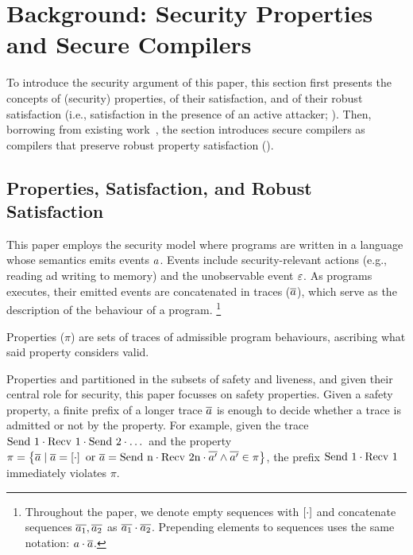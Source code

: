 \documentclass[utf8,acmsmall,review,screen,dvipsnames]{acmart}
\begin{document}
\section{Background: Security Properties and Secure Compilers}\label{sec:background}
To introduce the security argument of this paper, this section first presents the concepts of (security) properties, of their satisfaction, and of their robust satisfaction (i.e., satisfaction in the presence of an active attacker; ).
Then, borrowing from existing work~\cite{abate2019jour,abate2021extacc,patrignani2021rsc}, the section introduces secure compilers as compilers that preserve robust property satisfaction ().

\subsection{Properties, Satisfaction, and Robust Satisfaction}\label{subsec:bg:tprop}

This paper employs the security model where programs are written in a language whose semantics emits events $\event$.
Events include security-relevant actions (e.g., reading ad writing to memory) and the unobservable event $\emptyevent$.
As programs executes, their emitted events are concatenated in traces ($\trace$), which serve as the description of the behaviour of a program.%
\footnote{
Throughout the paper, we denote empty sequences with $\hole{\cdot}$ and concatenate sequences $\trace[_{1}],\trace[_{2}]$ as $\trace[_{1}]\cdot\trace[_{2}]$.
Prepending elements to sequences uses the same notation: $\event\cdot\trace$.
}

Properties ($\pi$) are sets of traces of admissible program behaviours, ascribing what said property considers valid.



Properties and partitioned in the subsets of safety and liveness, and given their central role for security, this paper focusses on safety properties.
Given a safety property, a finite prefix of a longer trace $\trace$ is enough to decide whether a trace is admitted or not by the property. %
For example, given the trace $\ev{Send\ 1}\cdot\ev{Recv\ 1}\cdot\ev{Send\ 2}\cdot\dots$ and the property $\pi=\left\{\trace \mid \trace=\hole{\cdot} \text{ or } \trace=\ev{Send\ n}\cdot\ev{Recv\ 2n}\cdot\trace[']\wedge \trace[']\in\pi\right\}$, the prefix $\ev{Send\ 1}\cdot\ev{Recv\ 1}$ immediately violates $\pi$.
\end{document}
